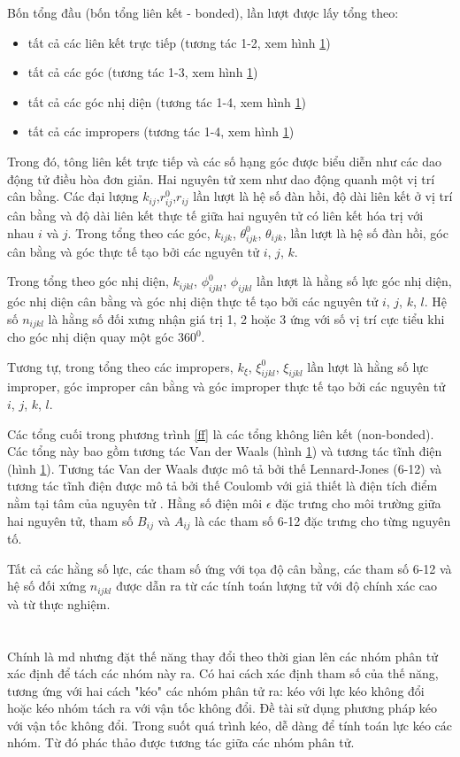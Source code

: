 \documentclass[12pt,a4paper,reqno, oneside]{book}
\begin{document}
		Bốn tổng đầu (bốn tổng liên kết - bonded), lần lượt được lấy tổng theo:
		\begin{itemize}
		\item tất cả các liên kết trực tiếp (tương tác 1-2, xem hình \ref{})
		\item tất cả các góc (tương tác 1-3, xem hình \ref{})
		\item tất cả các góc nhị diện (tương tác 1-4, xem hình \ref{})
		\item tất cả các impropers (tương tác 1-4, xem hình \ref{})
		\end{itemize}
		Trong đó, tông liên kết trực tiếp và các số hạng góc được biểu diễn như các dao động tử điều hòa đơn giản. Hai nguyên tử xem như dao động quanh một vị trí cân bằng.
		Các đại lượng $k_{ij}$,$r^{0}_{ij}$,$r_{ij}$ lần lượt là hệ số đàn hồi, độ dài liên kết ở vị trí cân bằng và độ dài liên kết thực tế giữa hai nguyên tử có liên kết hóa trị với nhau $i$ và $j$.
		Trong tổng theo các góc, $k_{ijk}$, $\theta^{0}_{ijk}$, $\theta_{ijk}$, lần lượt là hệ số đàn hồi, góc cân bằng và góc thực tế tạo bởi các nguyên tử $i$, $j$, $k$.
			
		Trong tổng theo góc nhị diện, $k_{ijkl}$, $\phi^{0}_{ijkl}$, $\phi_{ijkl}$ lần lượt là hằng số lực góc nhị diện, góc nhị diện cân bằng và góc nhị diện thực tế tạo bởi các nguyên tử $i$, $j$, $k$, $l$. Hệ số $n_{ijkl}$ là hằng số đối xưng nhận giá trị 1, 2 hoặc 3 ứng với số vị trí cực tiểu khi cho góc nhị diện quay một góc $360^{0}$.
			
		Tương tự, trong tổng theo các impropers, $k_{\xi}$, $\xi^{0}_{ijkl}$, $\xi_{ijkl}$ lần lượt là hằng số lực improper, góc improper cân bằng và góc improper thực tế tạo bởi các nguyên tử $i$, $j$, $k$, $l$.
			
		Các tổng cuối trong phương trình \eqref{ff} là các tổng không liên kết (non-bonded). Các tổng này bao gồm tương tác Van der Waals (hình \ref{}) và tương tác tĩnh điện (hình \ref{}). Tương tác Van der Waals được mô tả bởi thế Lennard-Jones (6-12) và tương tác tĩnh điện được mô tả bởi thế Coulomb với giả thiết là điện tích điểm nằm tại tâm của nguyên tử \cite{}. Hằng số điện môi $\epsilon$ đặc trưng cho môi trường giữa hai nguyên tử, tham số $B_{ij}$ và $A_{ij}$ là các tham số 6-12 đặc trưng cho từng nguyên tố.
			
		Tất cả các hằng số lực, các tham số ứng với tọa độ cân bằng, các tham số 6-12 và hệ số đối xứng $n_{ijkl}$ được dẫn ra từ các tính toán lượng tử với độ chính xác cao và từ thực nghiệm\cite{}.
\section{}
Chính là \gls{md} nhưng đặt thế năng thay đổi theo thời gian lên các nhóm phân tử xác định để tách các nhóm này ra. Có hai cách xác định tham số của thế năng, tương ứng với hai cách "kéo" các nhóm phân tử ra: kéo với lực kéo không đổi hoặc kéo nhóm tách ra với vận tốc không đổi. Đề tài sử dụng phương pháp kéo với vận tốc không đổi.
Trong suốt quá trình kéo, dễ dàng để tính toán lực kéo các nhóm. Từ đó phác thảo được tương tác giữa các nhóm phân tử.
\end{document}
